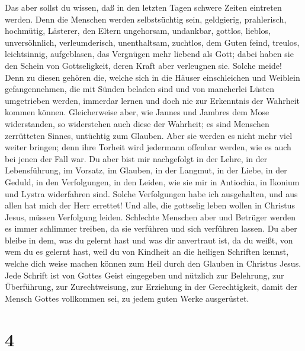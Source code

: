  Das aber sollst du wissen, daß in den letzten Tagen
schwere Zeiten eintreten werden.  Denn die Menschen werden
selbstsüchtig sein, geldgierig, prahlerisch, hochmütig, Lästerer, den
Eltern ungehorsam, undankbar, gottlos,  lieblos,
unversöhnlich, verleumderisch, unenthaltsam, zuchtlos, dem Guten feind,
 treulos, leichtsinnig, aufgeblasen, das Vergnügen mehr
liebend als Gott;  dabei haben sie den Schein von
Gottseligkeit, deren Kraft aber verleugnen sie. Solche meide!
 Denn zu diesen gehören die, welche sich in die Häuser
einschleichen und Weiblein gefangennehmen, die mit Sünden beladen sind
und von mancherlei Lüsten umgetrieben werden,  immerdar
lernen und doch nie zur Erkenntnis der Wahrheit kommen können.
 Gleicherweise aber, wie Jannes und Jambres dem Mose
widerstanden, so widerstehen auch diese der Wahrheit; es sind Menschen
zerrütteten Sinnes, untüchtig zum Glauben.  Aber sie
werden es nicht mehr viel weiter bringen; denn ihre Torheit wird
jedermann offenbar werden, wie es auch bei jenen der Fall war.
 Du aber bist mir nachgefolgt in der Lehre, in der
Lebensführung, im Vorsatz, im Glauben, in der Langmut, in der Liebe, in
der Geduld,  in den Verfolgungen, in den Leiden, wie sie
mir in Antiochia, in Ikonium und Lystra widerfahren sind. Solche
Verfolgungen habe ich ausgehalten, und aus allen hat mich der Herr
errettet!  Und alle, die gottselig leben wollen in
Christus Jesus, müssen Verfolgung leiden.  Schlechte
Menschen aber und Betrüger werden es immer schlimmer treiben, da sie
verführen und sich verführen lassen.  Du aber bleibe in
dem, was du gelernt hast und was dir anvertraut ist, da du weißt, von
wem du es gelernt hast,  weil du von Kindheit an die
heiligen Schriften kennst, welche dich weise machen können zum Heil
durch den Glauben in Christus Jesus.  Jede Schrift ist
von Gottes Geist eingegeben und nützlich zur Belehrung, zur Überführung,
zur Zurechtweisung, zur Erziehung in der Gerechtigkeit, 
damit der Mensch Gottes vollkommen sei, zu jedem guten Werke
ausgerüstet.

\hypertarget{section-3}{%
\section{4}\label{section-3}}

